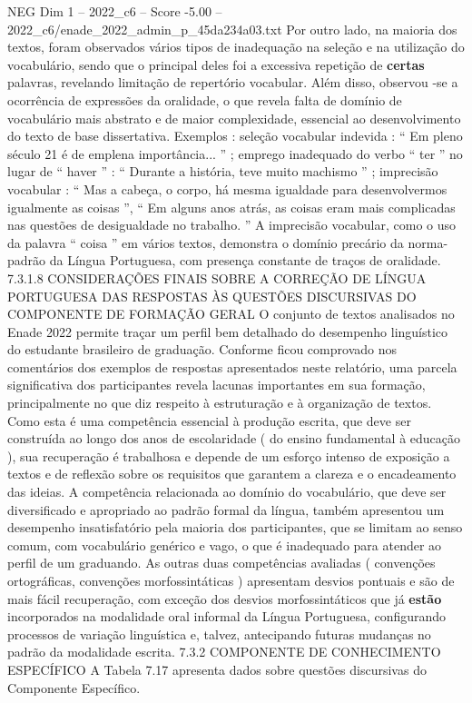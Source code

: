 \begin{textsample}{NEG Dim 1 – 2022\_c6 – Score -5.00 – 2022\_c6/enade\_2022\_admin\_p\_45da234a03.txt}
Por outro lado, na maioria dos textos, foram observados vários tipos de inadequação na seleção e na utilização do vocabulário, sendo que o principal deles foi a excessiva repetição de \textbf{certas} palavras, revelando limitação de repertório vocabular.
Além disso, observou -se a ocorrência de expressões da oralidade, o que revela falta de domínio de vocabulário mais abstrato e de maior complexidade, essencial ao desenvolvimento do texto de base dissertativa.
Exemplos : seleção vocabular indevida : “ Em pleno século 21 é de emplena importância... ” ; emprego inadequado do verbo “ ter ” no lugar de “ haver ” : “ Durante a história, teve muito machismo ” ; imprecisão vocabular : “ Mas a cabeça, o corpo, há mesma igualdade para desenvolvermos igualmente as coisas ”, “ Em alguns anos atrás, as coisas eram mais complicadas nas questões de desigualdade no trabalho. ” A imprecisão vocabular, como o uso da palavra “ coisa ” em vários textos, demonstra o domínio precário da norma-padrão da Língua Portuguesa, com presença constante de traços de oralidade. 7.3.1.8 CONSIDERAÇÕES FINAIS SOBRE A CORREÇÃO DE LÍNGUA PORTUGUESA DAS RESPOSTAS ÀS QUESTÕES DISCURSIVAS DO COMPONENTE DE FORMAÇÃO GERAL O conjunto de textos analisados no Enade 2022 permite traçar um perfil bem detalhado do desempenho linguístico do estudante brasileiro de graduação.
Conforme ficou comprovado nos comentários dos exemplos de respostas apresentados neste relatório, uma parcela significativa dos participantes revela lacunas importantes em sua formação, principalmente no que diz respeito à estruturação e à organização de textos.
Como esta é uma competência essencial à produção escrita, que deve ser construída ao longo dos anos de escolaridade ( do ensino fundamental à educação ), sua recuperação é trabalhosa e depende de um esforço intenso de exposição a textos e de reflexão sobre os requisitos que garantem a clareza e o encadeamento das ideias.
A competência relacionada ao domínio do vocabulário, que deve ser diversificado e apropriado ao padrão formal da língua, também apresentou um desempenho insatisfatório pela maioria dos participantes, que se limitam ao senso comum, com vocabulário genérico e vago, o que é inadequado para atender ao perfil de um graduando.
As outras duas competências avaliadas ( convenções ortográficas, convenções morfossintáticas ) apresentam desvios pontuais e são de mais fácil recuperação, com exceção dos desvios morfossintáticos que já \textbf{estão} incorporados na modalidade oral informal da Língua Portuguesa, configurando processos de variação linguística e, talvez, antecipando futuras mudanças no padrão da modalidade escrita. 7.3.2 COMPONENTE DE CONHECIMENTO ESPECÍFICO A Tabela 7.17 apresenta dados sobre questões discursivas do Componente Específico.

\end{textsample}
